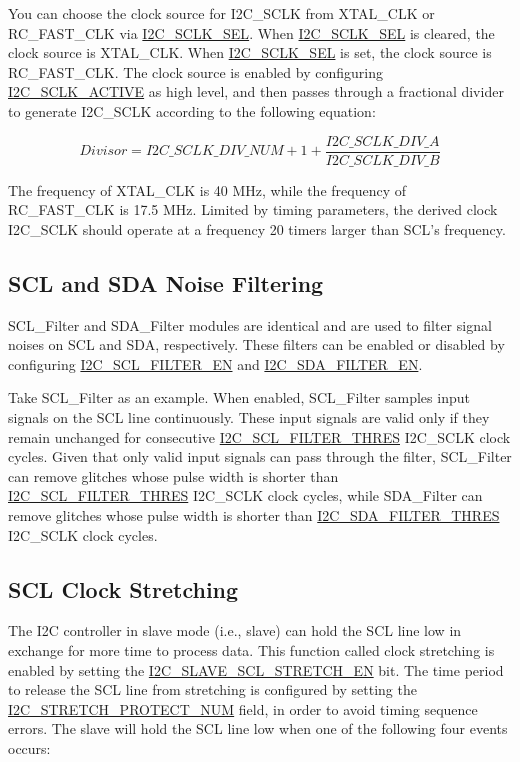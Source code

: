 \documentclass[main\_\_EN.tex]{subfiles}
\begin{document}
You can choose the clock source for I2C\_SCLK from XTAL\_CLK or RC\_FAST\_CLK via \hyperref[fielddesc:I2CSCLKSEL]{I2C\_SCLK\_SEL}. When \hyperref[fielddesc:I2CSCLKSEL]{I2C\_SCLK\_SEL} is cleared, the clock source is XTAL\_CLK. When \hyperref[fielddesc:I2CSCLKSEL]{I2C\_SCLK\_SEL} is set, the clock source is RC\_FAST\_CLK. The clock source is enabled by configuring \hyperref[fielddesc:I2CSCLKACTIVE]{I2C\_SCLK\_ACTIVE} as high level, and then passes through a fractional divider to generate I2C\_SCLK according to the following equation:

\[
Divisor = I2C\_SCLK\_DIV\_ NUM + 1+\frac{ \hyperref[fielddesc:I2CSCLKDIVA]{I2C\_SCLK\_DIV\_A}}{\hyperref[fielddesc:I2CSCLKDIVB]{I2C\_SCLK\_DIV\_B}}
\]

The frequency of XTAL\_CLK is 40 MHz, while the frequency of RC\_FAST\_CLK is 17.5 MHz. Limited by timing parameters, the derived clock I2C\_SCLK should operate at a frequency 20 timers larger than SCL's frequency.

\subsection{SCL and SDA Noise Filtering}
SCL\_Filter and SDA\_Filter modules are identical and are used to filter signal noises on SCL and SDA, respectively. These filters can be enabled or disabled by configuring \hyperref[fielddesc:I2CSCLFILTEREN]{I2C\_SCL\_FILTER\_EN} and \hyperref[fielddesc:I2CSDAFILTEREN]{I2C\_SDA\_FILTER\_EN}.

Take SCL\_Filter as an example. When enabled, SCL\_Filter samples input signals on the SCL line continuously. These input signals are valid only if they remain unchanged for consecutive \hyperref[fielddesc:I2CSCLFILTERTHRES]{I2C\_SCL\_FILTER\_THRES} I2C\_SCLK clock cycles. Given that only valid input signals can pass through the filter, SCL\_Filter can remove glitches whose pulse width is shorter than \hyperref[fielddesc:I2CSCLFILTERTHRES]{I2C\_SCL\_FILTER\_THRES} I2C\_SCLK clock cycles, while SDA\_Filter can remove glitches whose pulse width is shorter than \hyperref[fielddesc:I2CSDAFILTERTHRES]{I2C\_SDA\_FILTER\_THRES} I2C\_SCLK clock cycles.

\subsection{SCL Clock Stretching}
The I2C controller in slave mode (i.e., slave) can hold the SCL line low in exchange for more time to process data. This function called clock stretching is enabled by setting the \hyperref[fielddesc:I2CSLAVESCLSTRETCHEN]{I2C\_SLAVE\_SCL\_STRETCH\_EN} bit. The time period to release the SCL line from stretching is configured by setting the \hyperref[fielddesc:I2CSTRETCHPROTECTNUM]{I2C\_STRETCH\_PROTECT\_NUM} field, in order to avoid timing sequence errors.
The slave will hold the SCL line low when one of the following four events occurs:
\end{document}
